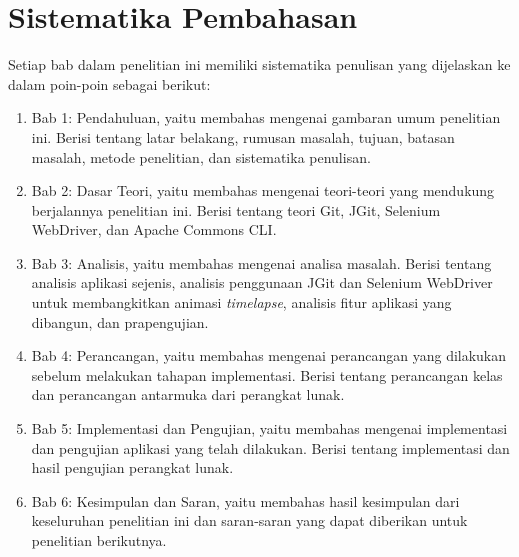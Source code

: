 \section{Sistematika Pembahasan}
\label{sec:sispem}
Setiap bab dalam penelitian ini memiliki sistematika penulisan yang dijelaskan ke dalam poin-poin sebagai berikut:
\begin{enumerate}
		\item Bab 1: Pendahuluan, yaitu membahas mengenai gambaran umum penelitian ini. Berisi tentang latar belakang, rumusan masalah, tujuan, batasan masalah, metode penelitian, dan sistematika penulisan.
		\item Bab 2: Dasar Teori, yaitu membahas mengenai teori-teori yang mendukung berjalannya penelitian ini. Berisi tentang teori Git, JGit, Selenium WebDriver, dan Apache Commons CLI.
		\item Bab 3: Analisis, yaitu membahas mengenai analisa masalah. Berisi tentang analisis aplikasi sejenis, analisis penggunaan JGit dan Selenium WebDriver untuk membangkitkan animasi \textit{timelapse}, analisis fitur aplikasi yang dibangun, dan prapengujian.
		\item Bab 4: Perancangan, yaitu membahas mengenai perancangan yang dilakukan sebelum melakukan tahapan implementasi. Berisi tentang perancangan kelas dan perancangan antarmuka dari perangkat lunak.
		\item Bab 5: Implementasi dan Pengujian, yaitu membahas mengenai implementasi dan pengujian aplikasi yang telah dilakukan. Berisi tentang implementasi dan hasil pengujian perangkat lunak.
		\item Bab 6: Kesimpulan dan Saran, yaitu membahas hasil kesimpulan dari keseluruhan penelitian ini dan saran-saran yang dapat diberikan untuk penelitian berikutnya.
	\end{enumerate}
